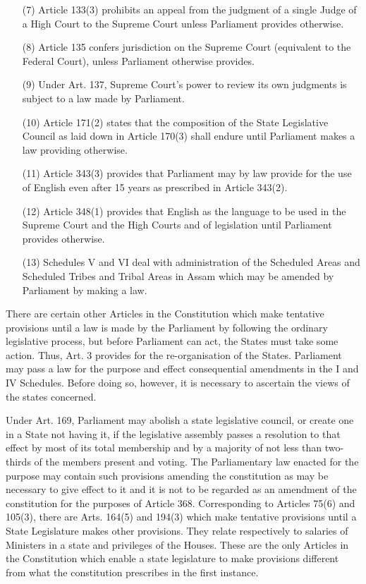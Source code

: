 \begin{multicols}{2}
\begin{enumerate}
\item[(7)] Article 133(3) prohibits an appeal from the judgment of a single Judge of a High Court to the
Supreme Court unless Parliament provides otherwise.

\item[(8)] Article 135 confers jurisdiction on the Supreme Court (equivalent to the Federal Court), unless
Parliament otherwise provides.

\item[(9)] Under Art. 137, Supreme Court's power to review its own judgments is subject to a law made
by Parliament.

\item[(10)] Article 171(2) states that the composition of the State Legislative Council as laid down in
Article 170(3) shall endure until Parliament makes a law providing otherwise.

\item[(11)] Article 343(3) provides that Parliament may by law provide for the use of English even after
15 years as prescribed in Article 343(2).

\item[(12)] Article 348(1) provides that English as the language to be used in the Supreme Court and the
High Courts and of legislation until Parliament provides otherwise.

\item[(13)] Schedules V and VI deal with administration of the Scheduled Areas and Scheduled Tribes
and Tribal Areas in Assam which may be amended by Parliament by making a law.
\end{enumerate}

\vspace{-.3cm}

\noi
There are certain other Articles in the Constitution which make tentative provisions until a law is
made by the Parliament by following the ordinary legislative process, but before Parliament can
act, the States must take some action. Thus, Art. 3 provides for the re-organisation of the States.
Parliament may pass a law for the purpose and effect consequential amendments in the I and IV
Schedules. Before doing so, however, it is necessary to ascertain the views of the states concerned.

\noi
Under Art. 169, Parliament may abolish a state legislative council, or create one in a State not
having it, if the legislative assembly passes a resolution to that effect by most of its total
membership and by a majority of not less than two-thirds of the members present and voting. The
Parliamentary law enacted for the purpose may contain such provisions amending the constitution
as may be necessary to give effect to it and it is not to be regarded as an amendment of the
constitution for the purposes of Article 368. Corresponding to Articles 75(6) and 105(3), there
are Arts. 164(5) and 194(3) which make tentative provisions until a State Legislature makes other
provisions. They relate respectively to salaries of Ministers in a state and privileges of the Houses.
These are the only Articles in the Constitution which enable a state legislature to make provisions
different from what the constitution prescribes in the first instance.


\end{multicols}
